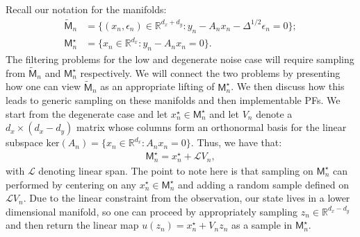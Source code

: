 \documentclass[english,13pt]{article}
\numberwithin{equation}{section}
\begin{document}
Recall our notation for the manifolds: 
%
\begin{align*}
 \widetilde{\mathsf{M}}_n&=\{(x_n,\epsilon_n)\in\mathbb{R}^{d_x+d_y}:
y_n - A_n x_n - \Delta^{1/2}\epsilon_n = 0\}; \\ 
 \mathsf{M}_n^{\star}  &=\{x_n\in\mathbb{R}^{d_x}:
y_n-A_n x_n = 0  \}.
\end{align*}
The filtering problems for the low and degenerate noise case will require sampling from  $\widetilde{\mathsf{M}}_n$ and $ \mathsf{M}_n^{\star}$ respectively. We will connect the two problems by presenting how one can view $\widetilde{\mathsf{M}}_n$  as an appropriate lifting of $ \mathsf{M}_n^{\star}$. We then discuss how this leads to generic sampling on these manifolds and then implementable PFs.
We start from the degenerate case and let $x_n^{\star}\in \mathsf{M}_n^{\star}$ and let $V_n$ denote a $d_x\times(d_x-d_y)$ matrix whose columns form an orthonormal basis for the linear subspace $ \text{ker}(A_n)=\{x_n\in\mathbb{R}^{d_x}:A_nx_n=0\}$.
Thus, we have that:
%
\begin{align*}
 \mathsf{M}_n^{\star} = x_n^{\star}  + \mathscr{L}V_n,
\end{align*}
with $\mathscr{L}$ denoting linear span. The point to note here is that sampling on $\mathsf{M}_n^{\star}$ can performed by centering on  any $x_n^{\star}\in\mathsf{M}_n^{\star}$ and adding a random sample defined on $ \mathscr{L}V_n$. Due to the linear constraint from the observation, our state lives in a lower dimensional manifold, so one can proceed by appropriately sampling $z_n\in \mathbb{R}^{d_x-d_y}$ and then return the linear map $u(z_n)=x_n^{\star}  +V_n z_n$ as  a sample in $\mathsf{M}_n^{\star}$. 
\end{document}
